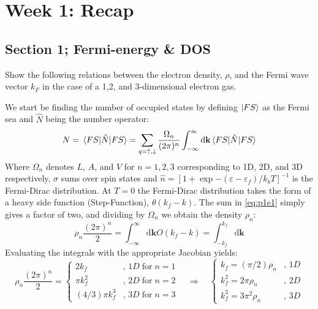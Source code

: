 \section{Week 1: Recap}
\subsection{Section 1; Fermi-energy \& DOS}
\begin{exercise}
Show the following relations between the electron density, $\rho$, and the Fermi wave vector $k_F$ in the case of a 1,2, and 3-dimensional electron gas.
\end{exercise}
\begin{solution}
We start be finding the number of occupied states by defining $|FS\rangle$ as the Fermi sea and $\hat{N}$ being the number operator:
\begin{equation}\label{eq:p1e1}
	N = \expval{\hat{N}}{FS} = \sum_{q=\uparrow,\downarrow} \dfrac{\Omega_n}{(2\pi)^n}\int_{-\infty}^{\infty}\mathrm{d}\textbf{k}\expval{\hat{N}}{FS}
\end{equation}
Where $\Omega_n$ denotes $L$, $A$, and $V$ for $n = 1,2,3$ corresponding to 1D, 2D, and 3D respectively, $\sigma$ sums over spin states and $\hat{n} = [1+\exp{-(\varepsilon-\varepsilon_f)/k_bT}]^{-1}$ is the Fermi-Dirac distribution. At $T = 0$ the Fermi-Dirac distribution takes the form of a heavy side function (Step-Function), $\theta(k_f-k)$. The sum in \eqref{eq:p1e1} simply gives a factor of two, and dividing by $\Omega_n$ we obtain the density $\rho_n$:
\begin{equation}
	\rho_n \dfrac{(2\pi)^n}{2} = \int_{-\infty}^{\infty}\mathrm{d}\textbf{k} O(k_f-k) = \int_{-k_f}^{k_f}\mathrm{d}\textbf{k}
\end{equation}
Evaluating the integrals with the appropriate Jacobian yields:
\begin{equation}
	\rho_n \dfrac{(2\pi)^n}{2} = \begin{cases}
		2 k_f & ,\,1D \; \mathrm{for} \;  n = 1 \\
		\pi k_f^2 & ,\,2D \; \mathrm{for} \; n = 2 \\
		(4/3) \pi k_f^3 & ,\,3D \; \mathrm{for} \; n = 3
	\end{cases}
	\quad \Rightarrow \quad \begin{cases}
		k_f = (\pi/2) \rho_n & ,\,1D \\
		k_f^2 = 2 \pi \rho_n & ,\,2D \\
		k_f^3 = 3 \pi^2\rho_n & ,\,3D
	\end{cases}
\end{equation}
\end{solution}
